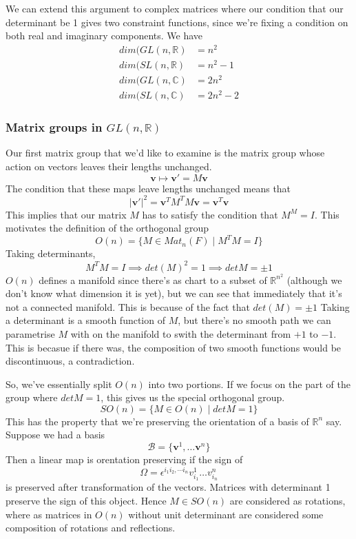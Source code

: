 We can extend this argument to complex matrices where our condition that our determinant be 1 gives two constraint functions, since we're fixing a condition on both real and imaginary components. We have 
\begin{align*} 
dim (GL(n, \mathbb{R} ) &= n^2 \\
dim (SL(n, \mathbb{R} ) &= n^2 - 1\\
dim (GL(n, \mathbb{C} ) &= 2n^2 \\
dim (SL(n, \mathbb{C} ) &= 2n^2 - 2
\end{align*} 

\subsubsection{Matrix groups in $GL(n, \mathbb{R} )$} 
Our first matrix group that we'd like to examine is the matrix group whose action on vectors leaves their lengths unchanged.
\[ 
\mathbf{v} \mapsto \mathbf{v}' = M \mathbf{v} 
\] 
The condition that these maps leave lengths unchanged means that 
\[ 
|\mathbf{v}'|^2 = \mathbf{v}^T M^TM \mathbf{v}  = \mathbf{v}^T \mathbf{v} 
\] 
This implies that our matrix $M$ has to satisfy the condition that $M^M  = I$. This motivates the definition of the orthogonal group 
\[ 
O(n)  = \{ M \in Mat_n(F) \mid M^T M = I \} 
\] 
Taking determinants, 
\[ 
M^T M = I \implies det (M )^2 = 1 \implies det M  = \pm 1 
\] 
$O(n)$ defines a manifold since there's as chart to a subset of $\mathbb{R}^{n^2 } $ (although we don't know what dimension it is yet), but we can see that immediately that it's not a connected manifold. This is because of the fact that $det (M ) = \pm 1$ Taking a determinant is a smooth function of $M$, but there's no smooth path we can parametrise $M$ with on the manifold to swith the determinant from $+1$ to $-1$. This is becasue if there was, the composition of two smooth functions would be discontinuous, a contradiction.

So, we've essentially split $O(n)$ into two portions. If we focus on the part of the group where $det M  =1$, this gives us the special orthogonal group. 
\[ 
SO( n) = \{ M \in O(n) \mid det M  = 1\} 
\] 
This has the property that we're preserving the orientation of a basis of $\mathbb{R}^n $ say. Suppose we had a basis 
\[ 
\mathcal{B}   = \{ \mathbf{v}^1 , \dots \mathbf{v}^n \} 
\] 
Then a linear map is orentation preserving if the sign of 
\[ 
\Omega  = \epsilon^{ i_1 i_2, \cdots i_n} v^1_{i_1} \dots v^n_{i_n } 
\] 
is preserved after transformation of the vectors. Matrices with determinant 1 preserve the sign of this object. Hence $M \in SO ( n) $ are considered as rotations, where as matrices in $O ( n ) $ without unit determinant are considered some composition of rotations and reflections. 

